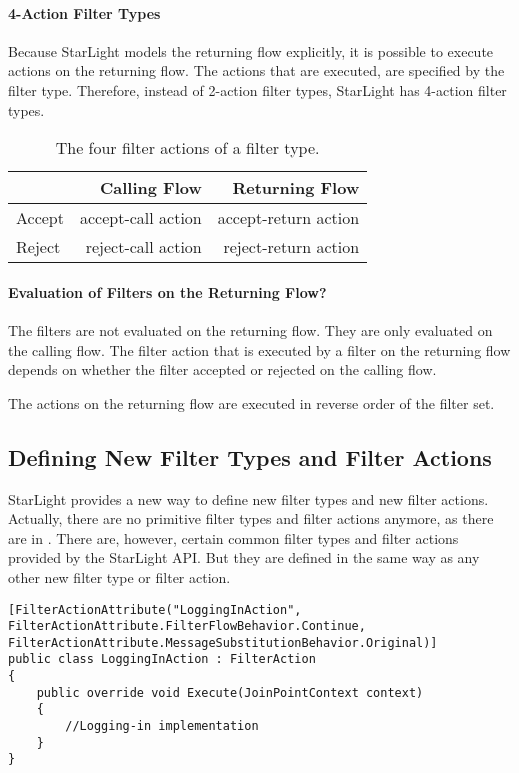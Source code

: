 \paragraph{4-Action Filter Types}
Because StarLight models the returning flow explicitly, it is possible to execute actions on the returning flow. The actions that are executed, are specified by the filter type. Therefore, instead of 2-action filter types, StarLight has 4-action filter types.
\begin{table}[htbp]
\begin{center}
\begin{tabular}{lrr}
 & Calling Flow& Returning Flow \\\hline
Accept & accept-call action & accept-return action\\
Reject & reject-call action & reject-return action\\
\end{tabular}
\end{center}
\caption{The four filter actions of a filter type.}
\label{tab:fourfilteractions}
\end{table}

\paragraph{Evaluation of Filters on the Returning Flow?}
The filters are not evaluated on the returning flow. They are only evaluated on the calling flow. The filter action that is executed by a filter on the returning flow depends on whether the filter accepted or rejected on the calling flow.

The actions on the returning flow are executed in reverse order of the filter set.

\subsection{Defining New Filter Types and Filter Actions}
StarLight provides a new way to define new filter types and new filter actions. Actually, there are no primitive filter types and filter actions anymore, as there are in \Compose*. There are, however, certain common filter types and filter actions provided by the StarLight API. But they are defined in the same way as any other new filter type or filter action.


\begin{lstlisting}[language={[Sharp]C},style=listing,caption={Defining the \expandafter{\lstinline|LoggingIn|} filter actions},label={lst:loggingactionsexample}]
[FilterActionAttribute("LoggingInAction", FilterActionAttribute.FilterFlowBehavior.Continue, FilterActionAttribute.MessageSubstitutionBehavior.Original)]
public class LoggingInAction : FilterAction
{
	public override void Execute(JoinPointContext context)
	{
		//Logging-in implementation
	}
} 
\end{lstlisting} 

